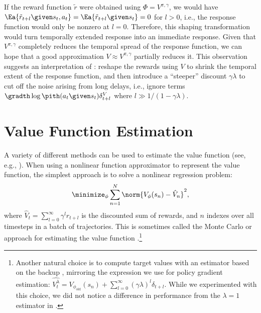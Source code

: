 \documentclass{article}
\newcommand{\dv}{\delta^V}
\newcommand{\phold}{\phi_{\text{old}}}
\newcommand{\delay}{l}
\newcommand{\Vpigam}{V^{\pi,\gamma}}
\newcommand{\tilr}{\tilde{r}}
\newcommand{\Vhat}{\hat{V}}
\begin{document}
If the reward function $\tilr$ were obtained using $\Phi=\Vpigam$, we would have $\Ea{\tilr_{t+\delay} \given s_t,a_t} = \Ea{\tilr_{t+\delay} \given s_t} = 0$ for $\delay > 0$, i.e., the response function would only be nonzero at $\delay=0$.
Therefore, this shaping transformation would turn temporally extended response into an immediate response.
Given that $\Vpigam$ completely reduces the temporal spread of the response function, we can hope that a good approximation $V \approx \Vpigam$ partially reduces it.
This observation suggests an interpretation of : reshape the rewards using $V$ to shrink the temporal extent of the response function, and then introduce a ``steeper'' discount $\gamma \lambda$ to cut off the noise arising from long delays, i.e., ignore terms $\gradth \log \pith(a_t \given s_t) \dv_{t+\delay}$ where $\delay \gg 1/(1-\gamma \lambda)$.







\section{Value Function Estimation}

A variety of different methods can be used to estimate the value function (see, e.g., \cite{bertsekas1995dynamic}).
When using a nonlinear function approximator to represent the value function, the simplest approach is to solve a nonlinear regression problem:
\begin{align}
\minimize_{\phi} \sum_{n=1}^N \norm{ V_{\phi}(s_n) - \Vhat_n }^2,
\label{eq:nonlinearreg}
\end{align}
where $\Vhat_t = \sum_{l=0}^{\infty} \gamma^l r_{t+l}$ is the discounted sum of rewards,
and $n$ indexes over all timesteps in a batch of trajectories.
This is sometimes called the Monte Carlo or \tdone{} approach for estimating the value function \citep{sutton1998introduction}.\footnote{Another natural choice is to compute target values with an estimator based on the \tdlam{} backup \citep{bertsekas1995dynamic,sutton1998introduction}, mirroring the expression we use for policy gradient estimation: $\hat{V^{\lambda}_t} =  V_{\phold}(s_n) + \sum_{\delay=0}^{\infty} (\gamma \lambda)^{\delay} \delta_{t+\delay}$.
While we experimented with this choice, we did not notice a difference in performance from the $\lambda=1$ estimator in .}
\end{document}
